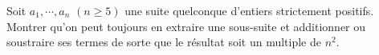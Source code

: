 Soit $a_1, \cdots, a_n$ $(n \geq 5)$ une suite quelconque d'entiers strictement positifs. Montrer qu'on peut toujours en extraire une sous-suite et additionner ou soustraire ses termes de sorte que le résultat soit un multiple de $n^2$.
